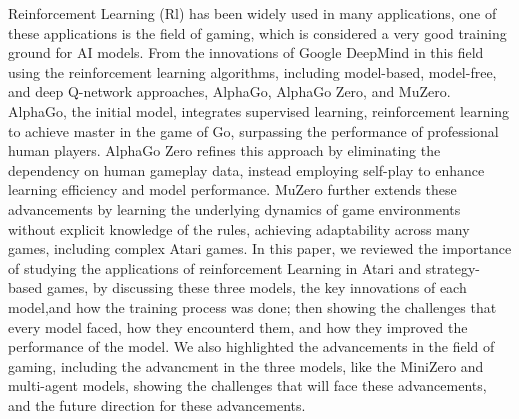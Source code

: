 Reinforcement Learning (Rl) has been widely used in many applications, 
one of these applications is the field of gaming, which is considered
a very good training ground for AI models. From the innovations of
Google DeepMind in this field using the reinforcement learning algorithms, including
model-based, model-free, and deep Q-network approaches, AlphaGo, 
AlphaGo Zero, and MuZero.
AlphaGo, the initial model, integrates supervised learning, reinforcement 
learning to achieve master in the 
game of Go, surpassing the performance of professional human players. 
AlphaGo Zero refines this approach by eliminating the dependency on human 
gameplay data, instead employing self-play to enhance learning efficiency and model performance. MuZero 
further extends these advancements by learning the underlying dynamics 
of game environments without explicit knowledge of the rules, achieving 
adaptability across many games, including complex Atari games. In this paper, 
we reviewed the 
importance of studying the applications of reinforcement Learning in 
Atari and strategy-based games, by discussing these three models, the key innovations of each model,and
how the training process was done; then
showing the challenges that every model faced, how they encounterd them,
and how they improved the performance of the model. We also highlighted
the advancements in the field of gaming, including the advancment in the three models, like the MiniZero 
and multi-agent models, showing the challenges that will face these
advancements, and the future direction for these advancements.